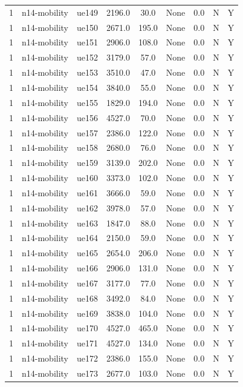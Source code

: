 \begin{table}[ht]
\begin{tabular}{|c|c|c|c|c|c|c|c|c|}
1 & n14-mobility & ue149 & 2196.0 & 30.0 & None & 0.0 & N & Y \\
1 & n14-mobility & ue150 & 2671.0 & 195.0 & None & 0.0 & N & Y \\
1 & n14-mobility & ue151 & 2906.0 & 108.0 & None & 0.0 & N & Y \\
1 & n14-mobility & ue152 & 3179.0 & 57.0 & None & 0.0 & N & Y \\
1 & n14-mobility & ue153 & 3510.0 & 47.0 & None & 0.0 & N & Y \\
1 & n14-mobility & ue154 & 3840.0 & 55.0 & None & 0.0 & N & Y \\
1 & n14-mobility & ue155 & 1829.0 & 194.0 & None & 0.0 & N & Y \\
1 & n14-mobility & ue156 & 4527.0 & 70.0 & None & 0.0 & N & Y \\
1 & n14-mobility & ue157 & 2386.0 & 122.0 & None & 0.0 & N & Y \\
1 & n14-mobility & ue158 & 2680.0 & 76.0 & None & 0.0 & N & Y \\
1 & n14-mobility & ue159 & 3139.0 & 202.0 & None & 0.0 & N & Y \\
1 & n14-mobility & ue160 & 3373.0 & 102.0 & None & 0.0 & N & Y \\
1 & n14-mobility & ue161 & 3666.0 & 59.0 & None & 0.0 & N & Y \\
1 & n14-mobility & ue162 & 3978.0 & 57.0 & None & 0.0 & N & Y \\
1 & n14-mobility & ue163 & 1847.0 & 88.0 & None & 0.0 & N & Y \\
1 & n14-mobility & ue164 & 2150.0 & 59.0 & None & 0.0 & N & Y \\
1 & n14-mobility & ue165 & 2654.0 & 206.0 & None & 0.0 & N & Y \\
1 & n14-mobility & ue166 & 2906.0 & 131.0 & None & 0.0 & N & Y \\
1 & n14-mobility & ue167 & 3177.0 & 77.0 & None & 0.0 & N & Y \\
1 & n14-mobility & ue168 & 3492.0 & 84.0 & None & 0.0 & N & Y \\
1 & n14-mobility & ue169 & 3838.0 & 104.0 & None & 0.0 & N & Y \\
1 & n14-mobility & ue170 & 4527.0 & 465.0 & None & 0.0 & N & Y \\
1 & n14-mobility & ue171 & 4527.0 & 134.0 & None & 0.0 & N & Y \\
1 & n14-mobility & ue172 & 2386.0 & 155.0 & None & 0.0 & N & Y \\
1 & n14-mobility & ue173 & 2677.0 & 103.0 & None & 0.0 & N & Y \\

\end{tabular}
\end{table}

